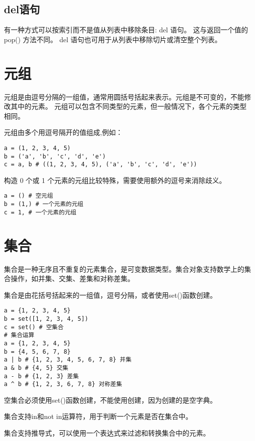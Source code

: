 \documentclass[a4paper, 12pt]{article}
\begin{document}
        \subsection{del语句}
            有一种方式可以按索引而不是值从列表中移除条目: del 语句。 
            这与返回一个值的 pop() 方法不同。 del 语句也可用于从列表中移除切片或清空整个列表。\par
        
    \section{元组}
        元组是由逗号分隔的一组值，通常用圆括号括起来表示。元组是不可变的，不能修改其中的元素。
        元组可以包含不同类型的元素，但一般情况下，各个元素的类型相同。\par
        元组由多个用逗号隔开的值组成,例如：\par
        \begin{listing}[h!]
            \begin{verbatim}
a = (1, 2, 3, 4, 5)
b = ('a', 'b', 'c', 'd', 'e')
c = a, b # ((1, 2, 3, 4, 5), ('a', 'b', 'c', 'd', 'e'))
            \end{verbatim}
        \end{listing}
        构造 0 个或 1 个元素的元组比较特殊，需要使用额外的逗号来消除歧义。\par
        \begin{listing}[h!]
            \begin{verbatim}
a = () # 空元组
b = (1,) # 一个元素的元组
c = 1, # 一个元素的元组
            \end{verbatim}
        \end{listing}
        
    \section{集合}
        集合是一种无序且不重复的元素集合，是可变数据类型。集合对象支持数学上的集合操作，如并集、交集、差集和对称差集。\par
        集合是由花括号括起来的一组值，逗号分隔，或者使用set()函数创建。\par
        \begin{listing}[h!]
            \begin{verbatim}
a = {1, 2, 3, 4, 5}
b = set([1, 2, 3, 4, 5])
c = set() # 空集合
# 集合运算
a = {1, 2, 3, 4, 5}
b = {4, 5, 6, 7, 8}
a | b # {1, 2, 3, 4, 5, 6, 7, 8} 并集
a & b # {4, 5} 交集
a - b # {1, 2, 3} 差集
a ^ b # {1, 2, 3, 6, 7, 8} 对称差集
            \end{verbatim}
        \end{listing}
        空集合必须使用set()函数创建，不能使用{}创建，因为{}创建的是空字典。\par
        集合支持in和not in运算符，用于判断一个元素是否在集合中。\par
        集合支持推导式，可以使用一个表达式来过滤和转换集合中的元素。\par
\end{document}
